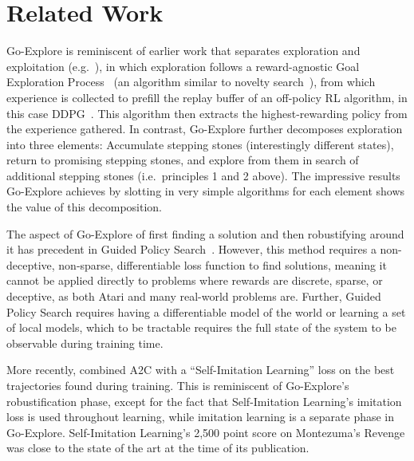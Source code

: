 \documentclass{article}
\begin{document}
\section{Related Work}
\label{sec:related_work}

Go-Explore is reminiscent of earlier work that separates exploration and exploitation (e.g.\ \citet{colas:geppg2018}), in which exploration follows a reward-agnostic Goal Exploration Process~\cite{forestier2017intrinsically} (an algorithm similar to novelty search~\cite{lehman}), from which experience is collected to prefill the replay buffer of an off-policy RL algorithm, in this case DDPG~\cite{Lillicrap2015ContinuousCW}. This algorithm then extracts the highest-rewarding policy from the experience gathered.
In contrast, Go-Explore further decomposes exploration into three elements: Accumulate stepping stones (interestingly different states), return to promising stepping stones, and explore from them in search of additional stepping stones (i.e.\ principles 1 and 2 above). The impressive results Go-Explore achieves by slotting in very simple algorithms for each element shows the value of this decomposition. 

The aspect of Go-Explore of first finding a solution and then robustifying around it has precedent in Guided Policy Search~\cite{levine2016end}. However, this method requires a non-deceptive, non-sparse, differentiable loss function to find solutions, meaning it cannot be applied directly to problems where rewards are discrete, sparse, or deceptive, as both Atari and many real-world problems are. Further, Guided Policy Search requires having a differentiable model of the world or learning a set of local models, which to be tractable requires the full state of the system to be observable during training time. 

More recently, \citet{Oh2018SelfImitationL} combined A2C with a ``Self-Imitation Learning'' loss on the best trajectories found during training. This is reminiscent of Go-Explore's robustification phase, except for the fact that Self-Imitation Learning's imitation loss is used throughout learning, while imitation learning is a separate phase in Go-Explore. Self-Imitation Learning's 2,500 point score on Montezuma's Revenge was close to the state of the art at the time of its publication.
\end{document}
